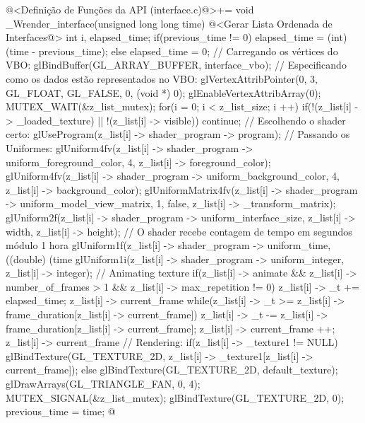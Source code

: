\iniciocodigo
@<Definição de Funções da API (interface.c)@>+=
void _Wrender_interface(unsigned long long time){
  @<Gerar Lista Ordenada de Interfaces@>
  {
    int i, elapsed_time;
    if(previous_time != 0)
      elapsed_time = (int) (time - previous_time);
    else
      elapsed_time = 0;
    // Carregando os vértices do VBO:
    glBindBuffer(GL_ARRAY_BUFFER, interface_vbo);
    // Especificando como os dados estão representados no VBO:
    glVertexAttribPointer(0, 3, GL_FLOAT, GL_FALSE, 0,
                          (void *) 0);
    glEnableVertexAttribArray(0);
    MUTEX_WAIT(&z_list_mutex);
    for(i = 0; i < z_list_size; i ++){
      if(!(z_list[i] -> _loaded_texture) || !(z_list[i] -> visible))
        continue;
      // Escolhendo o shader certo:
      glUseProgram(z_list[i] -> shader_program -> program);
      // Passando os Uniformes:
      glUniform4fv(z_list[i] -> shader_program -> uniform_foreground_color, 4,
                   z_list[i] -> foreground_color);
      glUniform4fv(z_list[i] -> shader_program -> uniform_background_color, 4,
                   z_list[i] -> background_color);
      glUniformMatrix4fv(z_list[i] -> shader_program ->
                           uniform_model_view_matrix, 1, false,
                         z_list[i] -> _transform_matrix);
      glUniform2f(z_list[i] -> shader_program -> uniform_interface_size,
                  z_list[i] -> width, z_list[i] -> height);
      // O shader recebe contagem de tempo em segundos módulo 1 hora
      glUniform1f(z_list[i] -> shader_program -> uniform_time,
                  ((double) (time %
      glUniform1i(z_list[i] -> shader_program -> uniform_integer,
                 z_list[i] -> integer);
      // Animating texture
      if(z_list[i] -> animate && z_list[i] -> number_of_frames > 1 &&
         z_list[i] -> max_repetition != 0){
        z_list[i] -> _t += elapsed_time;
        z_list[i] -> current_frame %
        while(z_list[i] -> _t >=
                     z_list[i] -> frame_duration[z_list[i] -> current_frame]){
          z_list[i] -> _t -=
            z_list[i] -> frame_duration[z_list[i] -> current_frame];
          z_list[i] -> current_frame ++;
          z_list[i] -> current_frame %
        }
      }
      // Rendering:
      if(z_list[i] -> _texture1 != NULL)
        glBindTexture(GL_TEXTURE_2D,
                      z_list[i] -> _texture1[z_list[i] -> current_frame]);
      else
        glBindTexture(GL_TEXTURE_2D, default_texture);
      glDrawArrays(GL_TRIANGLE_FAN, 0, 4);
    }
    MUTEX_SIGNAL(&z_list_mutex);
    glBindTexture(GL_TEXTURE_2D, 0);
  }
  previous_time = time;
}
@
\fimcodigo

